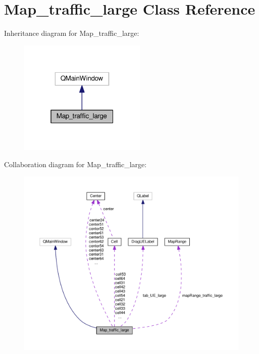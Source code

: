 \hypertarget{class_map__traffic__large}{}\section{Map\+\_\+traffic\+\_\+large Class Reference}
\label{class_map__traffic__large}


Inheritance diagram for Map\+\_\+traffic\+\_\+large\+:
\nopagebreak
\begin{figure}[H]
\begin{center}
\leavevmode
\includegraphics[width=172pt]{class_map__traffic__large__inherit__graph}
\end{center}
\end{figure}


Collaboration diagram for Map\+\_\+traffic\+\_\+large\+:
\nopagebreak
\begin{figure}[H]
\begin{center}
\leavevmode
\includegraphics[width=350pt]{class_map__traffic__large__coll__graph}
\end{center}
\end{figure}
